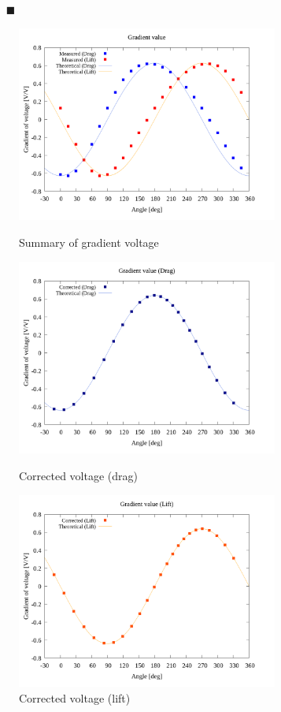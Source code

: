\documentclass[twocolumn,a4j]{jsarticle}
\begin{document}
\begin{itemize}
    \item [$\blacksquare$] 
\end{itemize}

\begin{figure}[htbp]
    \footnotesize
    \begin{center}
        \includegraphics[width=86mm]{../graphes/offset_x=5_y=5/20/20_adjust-value.png}
        \caption{Summary of gradient voltage}
        \includegraphics[width=86mm]{../graphes/offset_x=5_y=5/21/21-2_corrected_offset_drag.png}
        \caption{Corrected voltage (drag)}
        \includegraphics[width=86mm]{../graphes/offset_x=5_y=5/21/21-2_corrected_offset_lift.png}
        \caption{Corrected voltage (lift)}
    \end{center}
\end{figure}
\end{document}
